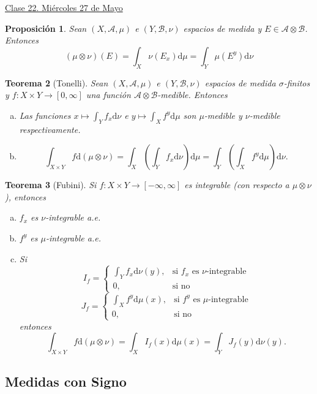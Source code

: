 \documentclass{article}
\newtheorem{theorem}{Teorema}[subsection]
\newtheorem{proposition}[theorem]{Proposición}
\theoremstyle{definition}
\theoremstyle{remark}
\numberwithin{equation}{section}
\newcommand{\A}{\mathcal{A}}
\newcommand{\B}{\mathcal{B}}
\renewcommand{\d}{\mathrm{d}}
\newcommand{\oo}{\infty}
\newcommand{\br}[1]{\left( #1 \right)}
\newcommand{\fecha}[1]{\begin{flushright} \underline{#1} \end{flushright}}
\begin{document}
\fecha{Clase 22. Miércoles 27 de Mayo}

\begin{proposition}
  Sean $(X,\A,\mu)$ e $(Y,\B,\nu)$ espacios de medida y $E \in \A \otimes \B$. Entonces
  \[ (\mu \otimes \nu)(E) = \int_X \nu(E_x) \d\mu = \int_Y \mu(E^y) \d\nu \]
\end{proposition}

\begin{theorem}
  [Tonelli]
  Sean $(X,\A,\mu)$ e $(Y,\B,\nu)$ espacios de medida $\sigma$-finitos y $f \colon X \times Y \to [0,\oo]$ una función $\A \otimes \B$-medible. Entonces
  \begin{enumerate}[(a)]
    \item Las funciones $x \mapsto \int_Y f_x \d\nu$ e $y \mapsto \int_X f^y \d\mu$ son $\mu$-medible y $\nu$-medible respectivamente.
    \item 
    \[ \int_{X \times Y} f \d(\mu \otimes \nu) = \int_X \br{\int_Y f_x \d\nu} \d\mu = \int_Y \br{\int_X f^y \d\mu} \d\nu. \]
  \end{enumerate}
\end{theorem}

\begin{theorem}
  [Fubini]
  Si $f \colon X \times Y \to [-\oo,\oo]$ es integrable (con respecto a $\mu\otimes\nu$), entonces
  \begin{enumerate}[(a)]
    \item $f_x$ es $\nu$-integrable a.e.
    \item $f^y$ es $\mu$-integrable a.e.
    \item Si
    \[ I_f = \begin{cases}
      \int_Y f_x \d\nu(y), &\text{si $f_x$ es $\nu$-integrable} \\
      0, &\text{si no}
    \end{cases} \]
    \[ J_f = \begin{cases}
      \int_X f^y \d\mu(x), &\text{si $f^y$ es $\mu$-integrable} \\
      0, &\text{si no}
    \end{cases} \]
    entonces
    \[ \int_{X \times Y} f \d(\mu \otimes \nu) = \int_X I_f(x) \d\mu(x) = \int_Y J_f(y) \d\nu(y). \]
  \end{enumerate}
\end{theorem}

\newpage
\subsection{Medidas con Signo}
\end{document}
